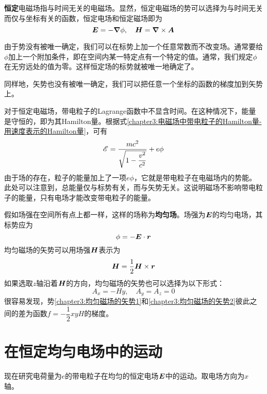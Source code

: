 {\bf 恒定}电磁场指与时间无关的电磁场。显然，恒定电磁场的势可以选择为与时间无关而仅与坐标有关的函数，恒定电场和恒定磁场即为
\begin{equation*}
	\boldsymbol{E} = -\boldsymbol{\nabla} \phi,\quad \boldsymbol{H} = \boldsymbol{\nabla} \times \boldsymbol{A}
\end{equation*}

由于势没有被唯一确定，我们可以在标势上加一个任意常数而不改变场。通常要给$\phi$加上一个附加条件，即在空间内某一特定点有一个特定的值。通常，我们规定$\phi$在无穷远处的值为零。这样恒定场的标势就被唯一地确定了。

同样地，矢势也没有被唯一确定，我们可以把任意一个坐标的函数的梯度加到矢势上。

对于恒定电磁场，带电粒子的Lagrange函数中不显含时间。在这种情况下，能量是守恒的，即为其Hamilton量。根据式\eqref{chapter3:电磁场中带电粒子的Hamilton量-用速度表示的Hamilton量}，可有
\begin{equation}
	\mathscr{E} = \frac{mc^2}{\sqrt{1-\dfrac{v^2}{c^2}}}+e\phi
	\label{chapter3:恒定电磁场中带电粒子的总能量}
\end{equation}
由于场的存在，粒子的能量加上了一项$e\phi$，它就是带电粒子在电磁场内的势能。此处可以注意到，总能量仅与标势有关，而与矢势无关。这说明磁场不影响带电粒子的能量，只有电场才能改变带电粒子的能量。

假如场强在空间所有点上都一样，这样的场称为{\bf 均匀场}。场强为$\boldsymbol{E}$的均匀电场，其标势应为
\begin{equation}
	\phi = -\boldsymbol{E}\cdot \boldsymbol{r}
	\label{chapter3:恒定均匀电场的标势}
\end{equation}
均匀磁场的矢势可以用场强$\boldsymbol{H}$表示为
\begin{equation}
	\boldsymbol{H} = \frac12 \boldsymbol{H}\times \boldsymbol{r}
	\label{chapter3:均匀磁场的矢势1}
\end{equation}
如果选取$z$轴沿着$\boldsymbol{H}$的方向，均匀磁场的矢势也可以选择为以下形式：
\begin{equation}
	A_x = -Hy,\quad A_y = A_z = 0
	\label{chapter3:均匀磁场的矢势2}
\end{equation}
很容易发现，势\eqref{chapter3:均匀磁场的矢势1}和\eqref{chapter3:均匀磁场的矢势2}彼此之间的差为函数$f = -\dfrac12 xyH$的梯度。

\section{在恒定均匀电场中的运动}

现在研究电荷量为$e$的带电粒子在均匀的恒定电场$\boldsymbol{E}$中的运动。取电场方向为$x$轴。